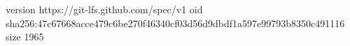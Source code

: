 version https://git-lfs.github.com/spec/v1
oid sha256:47c67668acce479c6be270f46340cf03d56d9dbdf1a597e99793b8350c491116
size 1965
